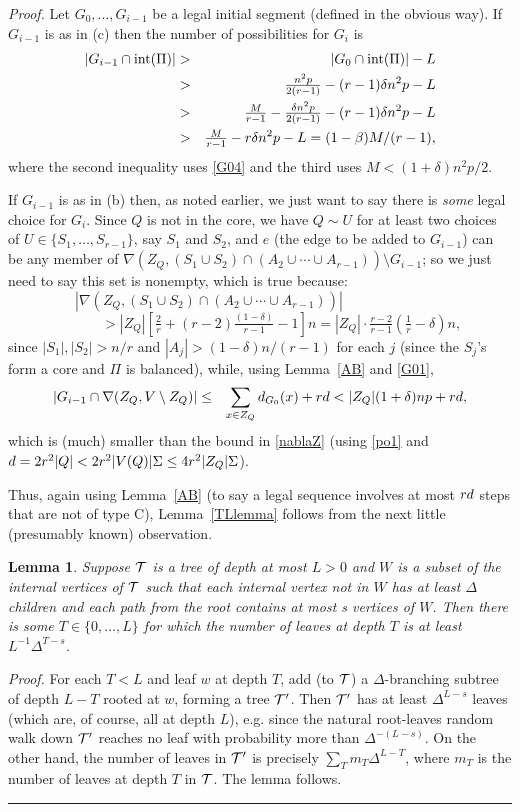 \documentclass[letterpaper,11pt]{article}
\newtheorem{lemma}[thm]{Lemma}
\newcommand{\beq}[1]{\begin{equation}\label{#1}}
\newcommand{\enq}[0]{\end{equation}}
\newcommand{\mn}[0]{\medskip\noindent}
\newcommand{\nin}[0]{\noindent}
\newcommand{\sm}[0]{\setminus}
\renewcommand{\dots}[0]{,\ldots,}
\newcommand{\T}[0]{{\cal T}}
\newcommand{\inte}[0]{{\rm int}}
\newcommand{\0}[0]{\emptyset}
\renewcommand{\qed}[0]{\begin{flushright} \rule{2mm}{3mm} \end{flushright}}
\newcommand{\gb}[0]{\beta }
\newcommand{\gd}[0]{\delta }
\newcommand{\gD}[0]{\Delta }
\newcommand{\gS}[0]{\Sigma}
\begin{document}
\mn
{\em Proof.}
Let $G_0\dots G_{i-1}$ be a legal initial segment
(defined in the obvious way).
If $G_{i-1}$ is as in (c) then the number of possibilities
for $G_i$ is
\begin{eqnarray*}
|G_{i-1}\cap \inte (\Pi)|
&> &|G_0\cap \inte (\Pi)|-L \\
&>& \tfrac{n^2p}{2(r-1)} - (r-1)\gd n^2p-L
\\
&>& \tfrac{M}{r-1} - \tfrac{\gd n^2p}{2(r-1)}
-(r-1)\gd n^2p-L\\
&>& \tfrac{M}{r-1} -r\gd n^2p-L
= (1-\gb)M/(r-1),
\end{eqnarray*}
where the second inequality uses
\eqref{G04} and the third uses $M< (1+\gd)n^2p/2$.

If $G_{i-1}$ is as in (b) then, as noted earlier, we just
want to say there is {\em some} legal choice for $G_i$.
Since $Q$ is not in the core, we have
$Q\sim U$ for at
least two choices of $U\in \{S_1\dots S_{r-1}\}$,
say $S_1$ and $S_2$,
and
$e$ (the edge to be added to $G_{i-1}$)
can be any member of
$\nabla(Z_Q,(S_1\cup S_2)\cap (A_2\cup \cdots\cup A_{r-1}))\sm G_{i-1}$;
so we just need to say this set is nonempty, which is true because:
\[
|\nabla(Z_Q,(S_1\cup S_2)\cap (A_2\cup \cdots\cup A_{r-1}))|
~~~~~~~~~~~~~~~~~~~~~~~~~~~~~~~~~
\]
\beq{nablaZ}
~~~~~~~~~~~~~~
> |Z_Q|\left[\tfrac{2}{r}+ (r-2)\tfrac{(1-\gd)}{r-1}-1\right]n
=
|Z_Q|\cdot\tfrac{r-2}{r-1}\left(\tfrac{1}{r}-\gd\right)n,
\enq
since $|S_1|,|S_2|> n/r
$
and $|A_j|> (1-\gd)n/(r-1)$ for each $j$
(since the $S_j$'s form a core and $\Pi$ is balanced),
while, using
Lemma~\ref{AB}
and \eqref{G01},
\begin{eqnarray*}
|G_{i-1}\cap \nabla(Z_Q,V\sm Z_Q)|
&\leq &
\sum _{x\in Z_Q}d_{G_{0}}(x) +r\qq < |Z_Q| (1+\gd)np +r\qq,
\end{eqnarray*}
which is (much) smaller than the bound in \eqref{nablaZ}
(using \eqref{po1} and
$\qq = 2r^2|Q| < 2r^2|V(Q)|\gS\leq 4r^2|Z_Q|\gS$).



\medskip
Thus, again using Lemma~\ref{AB} (to say a legal sequence
involves at most $rd$ steps that are not of type C),
Lemma~\ref{TLlemma}
follows from the next little
(presumably known) observation.

\begin{lemma}\label{treelemma}
Suppose $\T$ is a tree of depth at most $L>0$ and $W$ is a subset
of the internal vertices of $\T$ such that
each internal vertex not in $W$
has at least $\Delta$ children and each path from the root
contains at most s vertices of $W$.
Then there is some $T\in \{0\dots L\}$ for which the number of
leaves at depth $T$ is at least $L^{-1}\gD^{T-s}$.
\end{lemma}
\nin
{\em Proof.}
For each $T<L$ and leaf $w$ at depth $T$, add (to $\T$) a
$\gD$-branching subtree of depth $L-T$
rooted at $w$, forming a tree $\T'$.
Then
$\T'$ has at least $\gD^{L-s} $ leaves
(which are, of course, all at depth $L$), e.g. since
the natural root-leaves random walk down $\T'$
reaches no leaf with probability more than $\gD^{-(L-s)}$.
On the other hand, the number of leaves in $\T'$ is precisely
$\sum_T m_T\gD^{L-T}$, where
$m_T$ is the number of leaves at
depth $T$ in $\T$.
The lemma follows.
\qed
\end{document}
